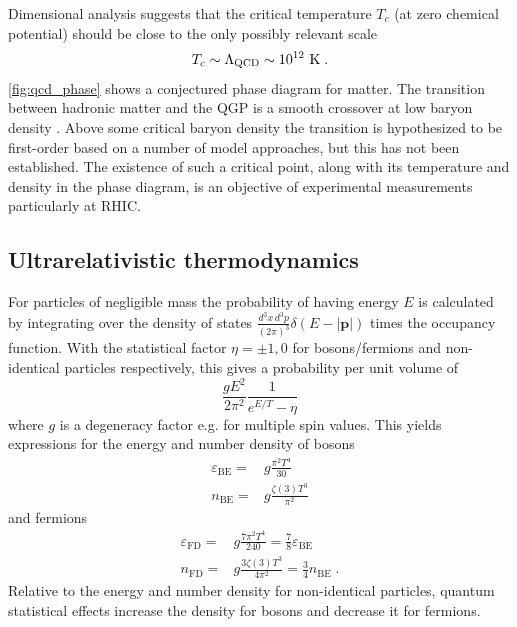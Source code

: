 Dimensional analysis suggests that the critical temperature $T_c$ (at zero chemical potential) should be close to the only possibly relevant scale
\[
T_c \sim \Lambda_\textrm{QCD} \sim 10^{12}~\mathrm{K}\; .
\]
\cref{fig:qcd_phase} shows a conjectured phase diagram for \qcd matter.
The transition between hadronic matter and the QGP is a smooth crossover at low baryon density \cite{Aoki:2006we}.
Above some critical baryon density the transition is hypothesized to be first-order based on a number of model approaches, but this has not been established.
The existence of such a critical point, along with its temperature and density in the phase diagram, is an objective of experimental measurements particularly at \ac{RHIC}.

\subsection{Ultrarelativistic thermodynamics}
For particles of negligible mass the probability of having energy $E$ is calculated by integrating over the density of states \( \frac{d^3 x \, d^3 p}{(2\pi)^3} \delta\left( E - |\mathbf{p}|\right)\) times the occupancy function.
With the statistical factor $\eta = \pm 1, 0$ for bosons/fermions and non-identical particles respectively, this gives a probability per unit volume of
\begin{equation}
\frac{g E^2}{2\pi^2} \frac{1}{e^{E/T} - \eta}
\end{equation}
where $g$ is a degeneracy factor e.g. for multiple spin values.
This yields expressions for the energy and number density of bosons
\begin{align}
  \varepsilon_\textrm{BE} =& g\frac{\pi^2 T^4}{30} \\
  n_\textrm{BE} =& g\frac{\zeta(3) T^3}{\pi^2}
\end{align}
and fermions
\begin{align}
  \varepsilon_\textrm{FD} =& g\frac{7 \pi^2 T^4}{240} = \frac{7}{8} \varepsilon_\textrm{BE} \\
  n_\textrm{FD} =& g\frac{3 \zeta(3) T^3}{4 \pi^2} = \frac{3}{4} n_\textrm{BE} \; .
\end{align}
Relative to the energy and number density for non-identical particles, quantum statistical effects increase the density for bosons and decrease it for fermions.

